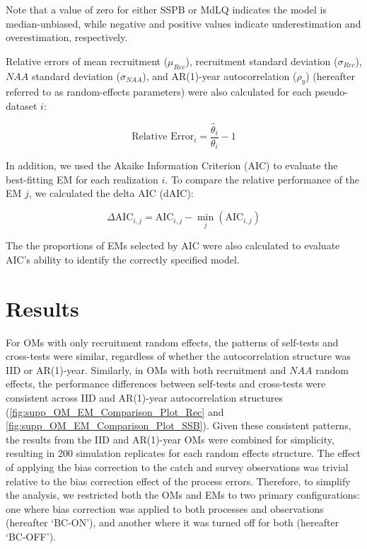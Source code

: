\documentclass[
  12pt,
]{article}
\begin{document}
Note that a value of zero for either SSPB or MdLQ indicates the model is
median-unbiased, while negative and positive values indicate
underestimation and overestimation, respectively.

Relative errors of mean recruitment (\(\mu_{Rec}\)), recruitment
standard deviation (\(\sigma_{Rec}\)), \(NAA\) standard deviation
(\(\sigma_{NAA}\)), and AR(1)-year autocorrelation (\(\rho_{y}\))
(hereafter referred to as random-effects parameters) were also
calculated for each pseudo-dataset \(i\):

\begin{equation}
\text{Relative Error}_{i} = \frac{\hat{\theta}_{i}}{\theta_{i}} - 1
\end{equation}

In addition, we used the Akaike Information Criterion (AIC) to evaluate
the best-fitting EM for each realization \(i\). To compare the relative
performance of the EM \(j\), we calculated the delta AIC (dAIC):

\begin{equation}
\Delta\text{AIC}_{i,j} = \text{AIC}_{i,j} - \min_{j}(\text{AIC}_{i,j})
\end{equation}

The the proportions of EMs selected by AIC were also calculated to
evaluate AIC's ability to identify the correctly specified model.

\section{Results}\label{results}

For OMs with only recruitment random effects, the patterns of self-tests
and cross-tests were similar, regardless of whether the autocorrelation
structure was IID or AR(1)-year. Similarly, in OMs with both recruitment
and \(NAA\) random effects, the performance differences between
self-tests and cross-tests were consistent across IID and AR(1)-year
autocorrelation structures (\autoref{fig:supp_OM_EM_Comparison_Plot_Rec}
and \autoref{fig:supp_OM_EM_Comparison_Plot_SSB}). Given these
consistent patterns, the results from the IID and AR(1)-year OMs were
combined for simplicity, resulting in 200 simulation replicates for each
random effects structure. The effect of applying the bias correction to
the catch and survey observations was trivial relative to the bias
correction effect of the process errors. Therefore, to simplify the
analysis, we restricted both the OMs and EMs to two primary
configurations: one where bias correction was applied to both processes
and observations (hereafter `BC-ON'), and another where it was turned
off for both (hereafter `BC-OFF').
\end{document}
